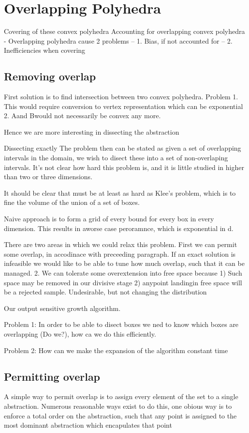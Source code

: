 \section{Overlapping Polyhedra}
Covering of these convex polyhedra
Accounting for overlapping convex polyhedra
- Overlapping polyhedra cause 2 problems
-- 1. Bias, if not accounted for
-- 2. Inefficiencies when covering

\subsection{Removing overlap}
First solution is to find intersection between two convex polyhedra.
Problem 1. This would require conversion to vertex representation which can be exponential
2. A\B and B\A would not necessarily be convex any more.

Hence we are more interesting in dissecting the abstraction

Dissecting exactly
The problem then can be stated as given a set of overlapping intervals in the domain, we wish to disect these into a set of non-overlaping intervals.
It's not clear how hard this problem is, and it is little studied in higher than two or three dimensions.

It should be clear that must be at least as hard as Klee's problem, which is to fine the volume of the union of a set of boxes.

Naive approach is to form a grid of every bound for every box in every dimension.  This results in aworse case peroramnce, which is exponential in d.

There are two areas in which we could relax this problem.  First we can permit some overlap, in accodinace with preceeding paragraph.  If an exact solution is infeasible we would like to be able to tune how much overlap, such that it can be managed.  2. We can tolerate some overextension into free space because 1) Such space may be removed in our divisive stage 2) anypoint landingin free space will be a rejected sample.  Undesirable, but not changing the distribution

Our output sensitive growth algorithm.

Problem 1: In order to be able to disect boxes we ned to know which boxes are overlapping (Do we?), how ca we do this efficiently.

Problem 2: How can we make the expansion of the algorithm constant time

\subsection{Permitting overlap}
A simple way to permit overlap is to assign every element of the set to a single abstraction.
Numerous reasonable ways exist to do this, one obious way is to enforce a total order on the abstraction, such that any point is assigned to the most dominant abstraction which encapulates that point

